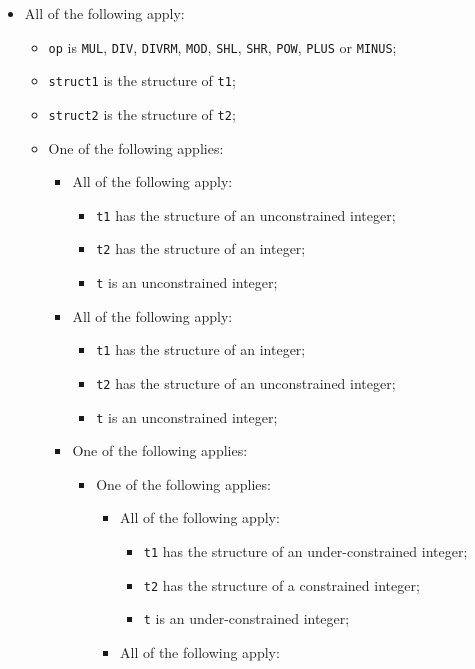 \documentclass{book}
\begin{document}
\begin{itemize}
  \item All of the following apply:
    \begin{itemize}
    \item \texttt{op} is \texttt{MUL}, \texttt{DIV}, \texttt{DIVRM}, \texttt{MOD}, \texttt{SHL}, \texttt{SHR}, \texttt{POW}, \texttt{PLUS} or \texttt{MINUS};
    \item \texttt{struct1} is the structure of \texttt{t1};
    \item \texttt{struct2} is the structure of \texttt{t2};
    \item One of the following applies:
      \begin{itemize}
      \item All of the following apply:
        \begin{itemize}
        \item \texttt{t1} has the structure of an unconstrained integer;
        \item \texttt{t2} has the structure of an integer;
        \item \texttt{t} is an unconstrained integer;
        \end{itemize}
      \item All of the following apply:
        \begin{itemize}
        \item \texttt{t1} has the structure of an integer;
        \item \texttt{t2} has the structure of an unconstrained integer;
        \item \texttt{t} is an unconstrained integer;
        \end{itemize}
      \item One of the following applies:
       \begin{itemize}
      \item One of the following applies:
       \begin{itemize}
       \item All of the following apply:
          \begin{itemize}
          \item \texttt{t1} has the structure of an under-constrained integer;
          \item \texttt{t2} has the structure of a constrained integer;
          \item \texttt{t} is an under-constrained integer;
          \end{itemize}
        \item All of the following apply:

\end{itemize}
\end{itemize}
\end{itemize}
\end{itemize}
\end{itemize}
\end{document}
